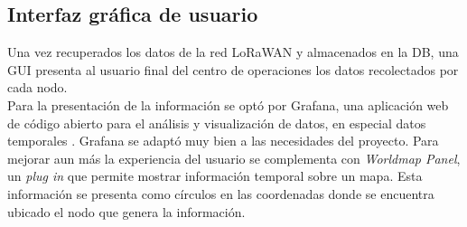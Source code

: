 \subsection{Interfaz gráfica de usuario}
Una vez recuperados los datos de la red LoRaWAN y almacenados en la DB, una GUI presenta al usuario final del centro de operaciones los datos recolectados por cada nodo.\\
Para la presentación de la información se optó por Grafana, una aplicación web de código abierto para el análisis y visualización de datos, en especial datos temporales \citep{grafana}.
Grafana se adaptó muy bien a las necesidades del proyecto. Para mejorar aun más la experiencia del usuario se complementa con \textit{Worldmap Panel}, un \textit{plug in} que permite mostrar información temporal sobre un mapa. Esta información se presenta como círculos en las coordenadas donde se encuentra ubicado el nodo que genera la información.
